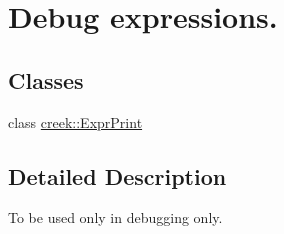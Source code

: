 \hypertarget{group__expression__debug}{}\section{Debug expressions.}
\label{group__expression__debug}
\subsection*{Classes}
\begin{DoxyCompactItemize}
\item 
class \hyperlink{classcreek_1_1_expr_print}{creek\+::\+Expr\+Print}
\end{DoxyCompactItemize}


\subsection{Detailed Description}
To be used only in debugging only. 